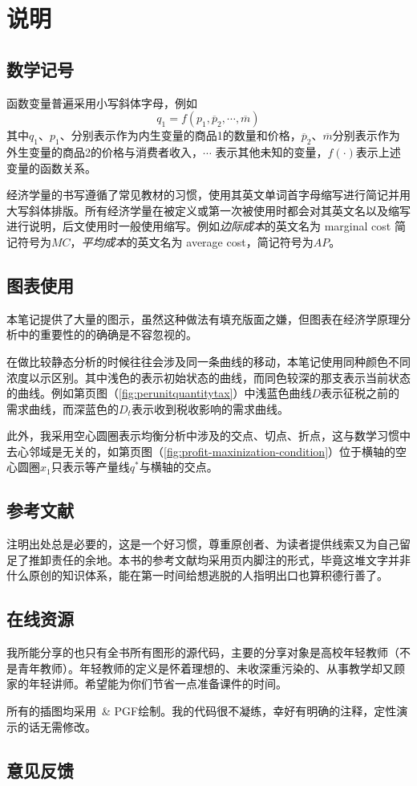 \chapter*{说明}

\section*{数学记号}
函数变量普遍采用小写斜体字母，例如
\[q_1=f(p_1, \overline p_2, \cdots, \overline m)\]
其中$q_1$、$p_1$、分别表示作为内生变量的商品1的数量和价格，$\overline p_2$、$\overline m$分别表示作为外生变量的商品2的价格与消费者收入，$\cdots$ 表示其他未知的变量，$f(\cdot)$表示上述变量的函数关系。%

经济学量的书写遵循了常见教材的习惯，使用其英文单词首字母缩写进行简记并用大写斜体排版。所有经济学量在被定义或第一次被使用时都会对其英文名以及缩写进行说明，后文使用时一般使用缩写。例如\emph{边际成本}的英文名为 marginal cost 简记符号为$MC$，\emph{平均成本}的英文名为 average cost，简记符号为$AP$。

\section*{图表使用}
本笔记提供了大量的图示，虽然这种做法有填充版面之嫌，但图表在经济学原理分析中的重要性的的确确是不容忽视的。

在做比较静态分析的时候往往会涉及同一条曲线的移动，本笔记使用同种颜色不同浓度以示区别。其中浅色的表示初始状态的曲线，而同色较深的那支表示当前状态的曲线。例如第\pageref{fig:perunitquantitytax}页图（\ref{fig:perunitquantitytax}）中浅蓝色曲线$D$表示征税之前的需求曲线，而深蓝色的$D_t$表示收到税收影响的需求曲线。

此外，我采用空心圆圈表示均衡分析中涉及的交点、切点、折点，这与数学习惯中去心邻域是无关的，如第\pageref{fig:profit-maxinization-condition}页图（\ref{fig:profit-maxinization-condition}）位于横轴的空心圆圈$x_1$只表示等产量线$q^*$与横轴的交点。

\section*{参考文献}
注明出处总是必要的，这是一个好习惯，尊重原创者、为读者提供线索又为自己留足了推卸责任的余地。本书的参考文献均采用页内脚注的形式，毕竟这堆文字并非什么原创的知识体系，能在第一时间给想逃脱的人指明出口也算积德行善了。

\section*{在线资源}
我所能分享的也只有全书所有图形的源代码，主要的分享对象是高校年轻教师（不是青年教师）。年轻教师的定义是怀着理想的、未收深重污染的、从事教学却又顾家的年轻讲师。希望能为你们节省一点准备课件的时间。

所有的插图均采用\tikzname~\& \textsc{PGF}绘制。我的代码很不凝练，幸好有明确的注释，定性演示的话无需修改。


\section*{意见反馈}